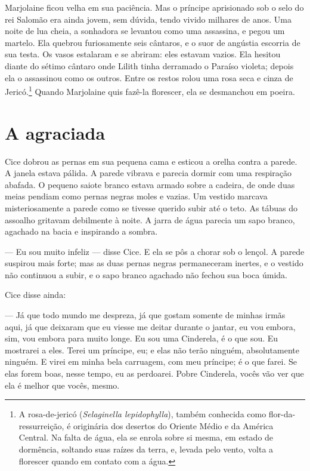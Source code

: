 Marjolaine ficou velha em sua paciência. Mas o príncipe aprisionado sob
o selo do rei Salomão era ainda jovem, sem dúvida, tendo vivido milhares
de anos. Uma noite de lua cheia, a sonhadora se levantou como uma
assassina, e pegou um martelo. Ela quebrou furiosamente seis cântaros, e o
suor de angústia escorria de sua testa. Os vasos estalaram e se abriram:
eles estavam vazios. Ela hesitou diante do sétimo cântaro onde Lilith
tinha derramado o Paraíso violeta; depois ela o assassinou como os outros.
Entre os restos rolou uma rosa seca e cinza de Jericó.\footnote{ A rosa-de-jericó 
(\textit{Selaginella lepidophylla}), também conhecida como flor-da-ressurreição, é originária dos
desertos do Oriente Médio e da América Central. Na falta
de água, ela se enrola sobre si mesma, em estado de dormência, soltando
suas raízes da terra, e, levada pelo vento, volta a florescer quando em
contato com a água.} Quando Marjolaine quis fazê-la florescer, ela se
desmanchou em poeira.

\section*{A agraciada}

Cice dobrou as pernas em sua pequena cama e esticou a orelha contra a
parede. A janela estava pálida. A parede vibrava e parecia dormir com uma
respiração abafada. O pequeno saiote branco estava armado sobre a cadeira,
de onde duas meias pendiam como pernas negras moles e vazias. Um vestido
marcava misteriosamente a parede como se tivesse querido subir até o teto.
As tábuas do assoalho gritavam debilmente à noite. A
jarra de água parecia um sapo branco, agachado na bacia e inspirando a
sombra.

--- Eu sou muito infeliz --- disse Cice. E ela se pôs a chorar sob o
lençol. A parede suspirou mais forte; mas as duas pernas negras
permaneceram inertes, e o vestido não continuou a subir, e o sapo branco
agachado não fechou sua boca úmida.

Cice disse ainda:

--- Já que todo mundo me despreza, já que gostam somente de minhas irmãs
aqui, já que deixaram que eu viesse me deitar durante o jantar, eu vou
embora, sim, vou embora para muito longe. Eu sou uma Cinderela, é o que
sou. Eu mostrarei a eles. Terei um príncipe, eu; e elas não terão ninguém,
absolutamente ninguém. E virei em minha bela carruagem, com meu príncipe;
é o que farei. Se elas forem boas, nesse tempo, eu as perdoarei. Pobre
Cinderela, vocês vão ver que ela é melhor que vocês, mesmo.

